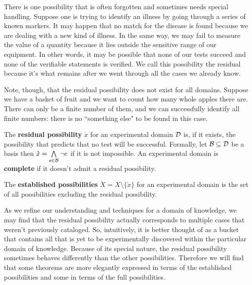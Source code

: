 \documentclass[11pt,letterpaper,fleqn]{memoir} %
\begin{document}
There is one possibility that is often forgotten and sometimes needs special handling. Suppose one is trying to identify an illness by going through a series of known markers. It may happen that no match for the disease is found because we are dealing with a new kind of illness. In the same way, we may fail to measure the value of a quantity because it lies outside the sensitive range of our equipment. In other words, it may be possible that none of our tests succeed and none of the verifiable statements is verified. We call this possibility the residual because it's what remains after we went through all the cases we already know.

Note, though, that the residual possibility does not exist for all domains. Suppose we have a basket of fruit and we want to count how many whole apples there are. There can only be a finite number of them, and we can successfully identify all finite numbers: there is no ``something else" to be found in this case.

\begin{mathSection}
	\begin{defn}
		The \textbf{residual possibility} $\mathring{x}$ for an experimental domain $\edomain$ is, if it exists, the possibility that predicts that no test will be successful. Formally, let $\basis \subseteq \edomain$ be a basis then  $\mathring{x} = \bigAND\limits_{\stmt[e] \in \basis} \NOT e$ if it is not impossible. An experimental domain is \textbf{complete} if it doesn't admit a residual possibility.
	\end{defn}

	\begin{defn}
	The \textbf{established possibilities} $\dot{X}=X\setminus\{\mathring{x}\}$ for an experimental domain is the set of all possibilities excluding the residual possibility.
\end{defn}
\end{mathSection}

As we refine our understanding and techniques for a domain of knowledge, we may find that the residual possibility actually corresponds to multiple cases that weren't previously cataloged. So, intuitively, it is better thought of as a bucket that contains all that is yet to be experimentally discovered within the particular domain of knowledge. Because of its special nature, the residual possibility sometimes behaves differently than the other possibilities. Therefore we will find that some theorems are more elegantly expressed in terms of the established possibilities and some in terms of the full possibilities.
\end{document}
